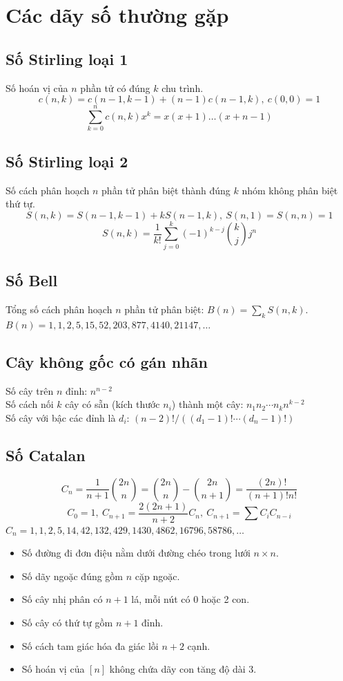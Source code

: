 \section{Các dãy số thường gặp}
	\subsection{Số Stirling loại 1}
		Số hoán vị của $n$ phần tử có đúng $k$ chu trình.
		\[ c(n,k) = c(n-1,k-1) + (n-1) c(n-1,k),\ c(0,0) = 1 \]
		\[ \textstyle \sum_{k=0}^n c(n,k)x^k = x(x+1) \dots (x+n-1) \]

	\subsection{Số Stirling loại 2}
		Số cách phân hoạch $n$ phần tử phân biệt thành đúng $k$ nhóm không phân biệt thứ tự.
		\[ S(n,k) = S(n-1,k-1) + k S(n-1,k),\ S(n,1) = S(n,n) = 1 \]
		\[ S(n,k) = \frac{1}{k!}\sum_{j=0}^k (-1)^{k-j}\binom{k}{j}j^n \]

	\subsection{Số Bell}
		Tổng số cách phân hoạch $n$ phần tử phân biệt: $B(n) = \sum_k S(n,k)$.
		$B(n) = 1, 1, 2, 5, 15, 52, 203, 877, 4140, 21147, \dots$

	\subsection{Cây không gốc có gán nhãn}
		Số cây trên $n$ đỉnh: $n^{n-2}$ \\
		Số cách nối $k$ cây có sẵn (kích thước $n_i$) thành một cây: $n_1n_2\cdots n_k n^{k-2}$ \\
		Số cây với bậc các đỉnh là $d_i$: $(n-2)! / ((d_1-1)! \cdots (d_n-1)!)$

	\subsection{Số Catalan}
		\[ C_n=\frac{1}{n+1}\binom{2n}{n}= \binom{2n}{n}-\binom{2n}{n+1} = \frac{(2n)!}{(n+1)!n!} \]
		\[ C_0=1,\ C_{n+1} = \frac{2(2n+1)}{n+2}C_n,\ C_{n+1}=\sum C_iC_{n-i} \]
		${C_n = 1, 1, 2, 5, 14, 42, 132, 429, 1430, 4862, 16796, 58786, \dots}$
		\begin{itemize}
		\item[-] Số đường đi đơn điệu nằm dưới đường chéo trong lưới $n\times n$.
		\item[-] Số dãy ngoặc đúng gồm $n$ cặp ngoặc.
		\item[-] Số cây nhị phân có $n+1$ lá, mỗi nút có 0 hoặc 2 con.
		\item[-] Số cây có thứ tự gồm $n+1$ đỉnh.
		\item[-] Số cách tam giác hóa đa giác lồi $n+2$ cạnh.
		\item[-] Số hoán vị của $[n]$ không chứa dãy con tăng độ dài 3.
		\end{itemize}
